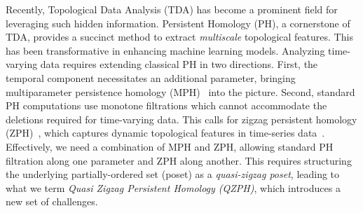\documentclass{article}
\theoremstyle{plain}
\theoremstyle{definition}
\theoremstyle{remark}
\begin{document}
Recently, Topological Data Analysis (TDA) has become a prominent field for leveraging such hidden information. Persistent Homology (PH), a cornerstone of TDA, provides a succinct method to extract \emph{multiscale} topological features. This has been transformative in enhancing machine learning models. Analyzing time-varying data requires extending classical PH in two directions. First, the temporal component necessitates an additional parameter, bringing multiparameter persistence homology (MPH)~\cite{BL23} into the picture. Second, standard PH computations use monotone filtrations which cannot accommodate the deletions required for time-varying data. This calls for zigzag persistent homology (ZPH)~\cite{carlsson2010zigzag}, which captures dynamic topological features in time-series data~\cite{munch23, gel21, zz_visnet,HL24,coskunuzer2024time,beltramo2022euler}. Effectively, we need a combination of MPH and ZPH, allowing standard PH filtration along one parameter and ZPH along another. This requires structuring the underlying partially-ordered set (poset) as a \emph{quasi-zigzag poset}, leading to what we term \emph{Quasi Zigzag Persistent Homology (QZPH)}, which introduces a new set of challenges.

\end{document}
